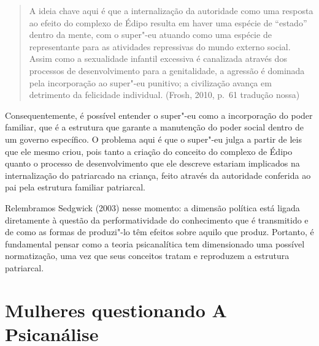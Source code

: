 \begin{quote}
A ideia chave aqui é que a internalização da autoridade como uma
resposta ao efeito do complexo de Édipo resulta em haver uma espécie de
``estado'' dentro da mente, com o super"-eu atuando como uma espécie de
representante para as atividades repressivas do mundo externo social.
Assim como a sexualidade infantil excessiva é canalizada através dos
processos de desenvolvimento para a genitalidade, a agressão é dominada
pela incorporação ao super"-eu punitivo; a civilização avança em
detrimento da felicidade individual. (Frosh, 2010, p.~61 tradução nossa)
\end{quote}

Consequentemente, é possível entender o super"-eu como a incorporação do
poder familiar, que é a estrutura que garante a manutenção do poder
social dentro de um governo específico. O problema aqui é que o super"-eu
julga a partir de leis que ele mesmo criou, pois tanto a criação do
conceito do complexo de Édipo quanto o processo de desenvolvimento que
ele descreve estariam implicados na internalização do patriarcado na
criança, feito através da autoridade conferida ao pai pela estrutura
familiar patriarcal.

Relembramos Sedgwick (2003) nesse momento: a dimensão política está
ligada diretamente à questão da performatividade do conhecimento que é
transmitido e de como as formas de produzi"-lo têm efeitos sobre aquilo
que produz. Portanto, é fundamental pensar como a teoria psicanalítica
tem dimensionado uma possível normatização, uma vez que seus conceitos
tratam e reproduzem a estrutura patriarcal.

\section{Mulheres questionando A Psicanálise }

